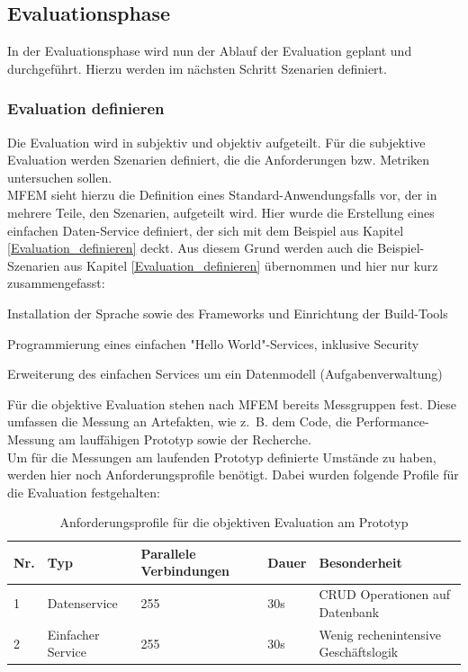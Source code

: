 \subsection{Evaluationsphase}

In der Evaluationsphase wird nun der Ablauf der Evaluation geplant und durchgeführt. Hierzu werden im nächsten Schritt Szenarien definiert.

\subsubsection{Evaluation definieren}

Die Evaluation wird in subjektiv und objektiv aufgeteilt. Für die subjektive Evaluation werden Szenarien definiert, die die Anforderungen bzw. Metriken untersuchen sollen.\\
\ac{MFEM} sieht hierzu die Definition eines Standard-Anwendungsfalls vor, der in mehrere Teile, den Szenarien, aufgeteilt wird. Hier wurde die Erstellung eines einfachen Daten-Service definiert, der sich mit dem Beispiel aus Kapitel \ref{Evaluation_definieren} deckt. Aus diesem Grund werden auch die Beispiel-Szenarien aus Kapitel \ref{Evaluation_definieren} übernommen und hier nur kurz zusammengefasst:

\begin{description}[leftmargin=!,labelwidth=\widthof{\bfseries Sz.3 Erweiterter Service}]
	\item[Sz.1 Installation] Installation der Sprache sowie des Frameworks und Einrichtung der Build-Tools
	\item[Sz.2 Einfacher Service] Programmierung eines einfachen "Hello World"-Services, inklusive Security
	\item[Sz.3 Erweiterter Service] Erweiterung des einfachen Services um ein Datenmodell (Aufgabenverwaltung)  
\end{description} 

Für die objektive Evaluation stehen nach \ac{MFEM} bereits Messgruppen fest. Diese umfassen die Messung an Artefakten, wie z.~B. dem Code, die Performance-Messung am lauffähigen Prototyp sowie der Recherche.\\
Um für die Messungen am laufenden Prototyp definierte Umstände zu haben, werden hier noch Anforderungsprofile benötigt. Dabei wurden folgende Profile für die Evaluation festgehalten:

\begin{table}[!h]
	\centering
	\begin{tabular}{p{1cm}p{4cm}p{2cm}p{2cm}p{4cm}}
		\textbf{Nr.} & \textbf{Typ} & \textbf{Parallele Verbindungen} & 
		\textbf{Dauer} & \textbf{Besonderheit} \\
		\hline
		1 	& Datenservice 			& 255	&	30s		& CRUD Operationen auf Datenbank  \\
		\hline
		2	& Einfacher Service		& 255 	&	30s		& Wenig rechenintensive Geschäftslogik   \\
		\hline
	\end{tabular}
	\caption[Anforderungsprofile]{Anforderungsprofile für die objektiven Evaluation am Prototyp}
	\label{AnforderungsprofileEval}
\end{table}


